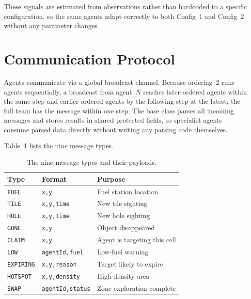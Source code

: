 \documentclass[letterpaper]{article}
\begin{document}
These signals are estimated from observations rather than hardcoded to a
specific configuration, so the same agents adapt correctly to both Config~1 and
Config~2 without any parameter changes.

\section{Communication Protocol}

Agents communicate via a global broadcast channel. Because ordering~2 runs
agents sequentially, a broadcast from agent~$N$ reaches later-ordered agents
within the same step and earlier-ordered agents by the following step at the
latest; the full team has the message within one step. The base class parses all
incoming messages and stores results in shared protected fields, so specialist
agents consume parsed data directly without writing any parsing code themselves.

Table~\ref{tab:messages} lists the nine message types.

\begin{table}[t]
\centering
\small
\begin{tabular}{@{}lll@{}}
\toprule
\textbf{Type} & \textbf{Format} & \textbf{Purpose} \\
\midrule
\texttt{FUEL}     & \texttt{x,y}           & Fuel station location \\
\texttt{TILE}     & \texttt{x,y,time}      & New tile sighting \\
\texttt{HOLE}     & \texttt{x,y,time}      & New hole sighting \\
\texttt{GONE}     & \texttt{x,y}           & Object disappeared \\
\texttt{CLAIM}    & \texttt{x,y}           & Agent is targeting this cell \\
\texttt{LOW}      & \texttt{agentId,fuel}  & Low-fuel warning \\
\texttt{EXPIRING} & \texttt{x,y,reason}    & Target likely to expire \\
\texttt{HOTSPOT}  & \texttt{x,y,density}   & High-density area \\
\texttt{SWAP}     & \texttt{agentId,status}& Zone exploration complete \\
\bottomrule
\end{tabular}
\caption{The nine message types and their payloads.}
\label{tab:messages}
\end{table}
\end{document}
